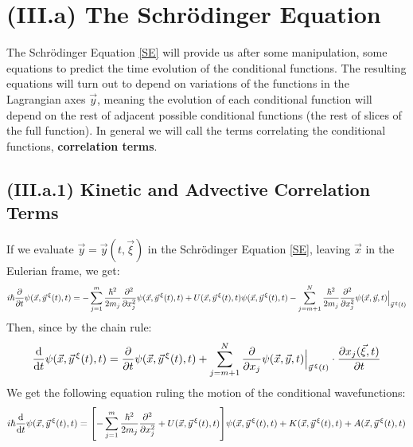 \documentclass[11pt, a4paper]{article} %
\begin{document}
\newpage


\section*{(III.a) The Schrödinger Equation}
The Schrödinger Equation \eqref{SE} will provide us after some manipulation, some equations to predict the time evolution of the conditional functions. The resulting equations will turn out to depend on variations of the functions in the Lagrangian axes $\vec{y}$, meaning the evolution of each conditional function will depend on the rest of adjacent possible conditional functions (the rest of slices of the full function). In general we will call the terms correlating the conditional functions, {\bf correlation terms}.
\subsection*{(III.a.1) Kinetic and Advective Correlation Terms}
If we evaluate $\vec{y}=\vec{y}(t,\vec{\xi})$ in the Schrödinger Equation \eqref{SE}, leaving $\vec{x}$ in the Eulerian frame, we get:
\begin{equation}
i\hbar \pdv{}{t}\psi(\vec{x}, \vec{y}^{\, \xi}(t),t)=-\sum_{j=1}^m \frac{\hbar^2}{2m_j}\pdv[2]{}{x_j} \psi(\vec{x}, \vec{y}^{\, \xi}(t),t) + U(\vec{x}, \vec{y}^{\, \xi}(t),t)\psi(\vec{x}, \vec{y}^{\, \xi}(t),t) -\sum_{j=m+1}^N \frac{\hbar^2}{2m_j}\pdv[2]{}{x_j} \psi(\vec{x}, \vec{y},t)\Big\rvert_{\vec{y}^{\, \xi}(t)}
\end{equation}
Then, since by the chain rule:
\begin{equation}
\dv{}{t}\psi(\vec{x}, \vec{y}^{\, \xi}(t),t)=\pdv{}{t}\psi(\vec{x}, \vec{y}^{\, \xi}(t),t)+\sum_{j=m+1}^N \pdv{}{x_j}\psi(\vec{x}, \vec{y},t)\Big\rvert_{\vec{y}^{\, \xi}(t)}\cdot \pdv{x_j(\vec{\xi},t)}{t}
\end{equation}
We get the following equation ruling the motion of the conditional wavefunctions:
\begin{equation}\label{KinAdvEL}
i\hbar \dv{}{t}\psi(\vec{x}, \vec{y}^{\, \xi}(t),t)=\qty[-\sum_{j=1}^m \frac{\hbar^2}{2m_j}\pdv[2]{}{x_j} + U(\vec{x}, \vec{y}^{\, \xi}(t),t)]\psi(\vec{x}, \vec{y}^{\, \xi}(t),t)+K(\vec{x}, \vec{y}^{\, \xi}(t),t)+A(\vec{x}, \vec{y}^{\, \xi}(t),t)
\end{equation}
\end{document}
